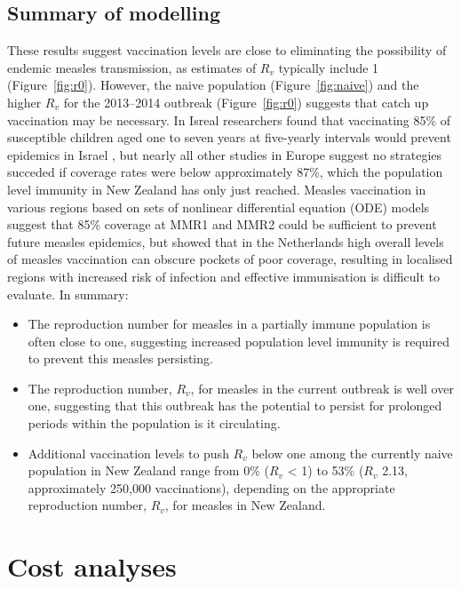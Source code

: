 \documentclass{article}
\begin{document}
\subsection{Summary of modelling}
These results suggest vaccination levels are close to eliminating the possibility of endemic measles transmission, as estimates of $R_v$ typically include 1 (Figure~\ref{fig:r0}). However, the naive population (Figure~\ref{fig:naive}) and the higher $R_v$ for the 2013--2014 outbreak (Figure~\ref{fig:r0}) suggests that catch up vaccination may be necessary. In Isreal researchers found that vaccinating 85\% of susceptible children aged one to seven years at five-yearly intervals would prevent epidemics in Israel \citep{agur93}, but nearly all other studies in Europe suggest no strategies succeded if coverage rates were below approximately 87\%, which the population level immunity in New Zealand has only just reached. Measles vaccination in various regions \citep{agur93, babad95, edmunds0, gay98, wallinga1} based on sets of nonlinear differential equation (ODE) models suggest that 85\% coverage at MMR1 and MMR2 could be sufficient to prevent future measles epidemics, but \citep{glass4} showed that in the Netherlands high overall levels of measles vaccination can obscure pockets of poor coverage, resulting in localised regions with increased risk of infection and effective immunisation is difficult to evaluate. 
In summary:
\begin{itemize}
\item The reproduction number for measles in a partially immune population is often close to one, suggesting increased population level immunity is required to prevent this measles persisting.
 \item The reproduction number, $R_v$, for measles in the current outbreak is well over one, suggesting that this outbreak has the potential to persist for prolonged periods within the population is it circulating.
 \item Additional vaccination levels to push $R_v$ below one among the currently naive population in New Zealand range from 0\% ($R_v$ < 1) to 53\% ($R_v$ 2.13, approximately 250,000 vaccinations), depending on the appropriate reproduction number, $R_v$, for measles in New Zealand.
\end{itemize}

\section{Cost analyses}
\end{document}
